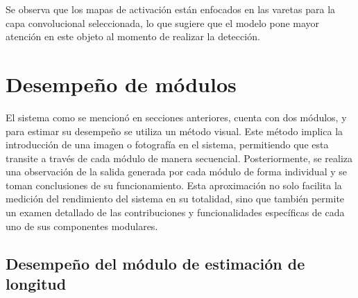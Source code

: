 Se observa que los mapas de activación están enfocados en las varetas para la capa convolucional seleccionada, lo que sugiere que el modelo pone mayor atención en este objeto al momento de realizar la detección.   

\section{Desempeño de módulos}
\label{sec:desempeñoModulos}

El sistema como se mencionó en secciones anteriores, cuenta con dos módulos, y para estimar su desempeño se utiliza un método visual. Este método implica la introducción de una imagen o fotografía en el sistema, permitiendo que esta transite a través de cada módulo de manera secuencial. Posteriormente, se realiza una observación de la salida generada por cada módulo de forma individual y se toman conclusiones de su funcionamiento. Esta aproximación no solo facilita la medición del rendimiento del sistema en su totalidad, sino que también permite un examen detallado de las contribuciones y funcionalidades específicas de cada uno de sus componentes modulares.

\subsection{Desempeño del módulo de estimación de longitud}